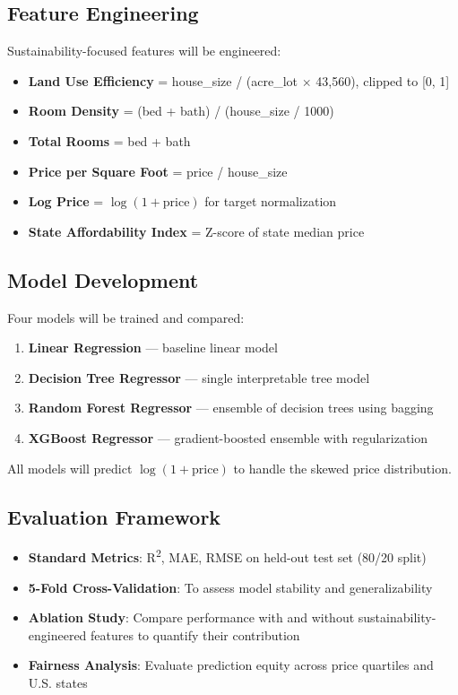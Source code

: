 \documentclass[12pt, a4paper]{article}
\begin{document}
\subsection{Feature Engineering}

Sustainability-focused features will be engineered:
\begin{itemize}
    \item \textbf{Land Use Efficiency} = house\_size / (acre\_lot $\times$ 43,560), clipped to [0, 1]
    \item \textbf{Room Density} = (bed + bath) / (house\_size / 1000)
    \item \textbf{Total Rooms} = bed + bath
    \item \textbf{Price per Square Foot} = price / house\_size
    \item \textbf{Log Price} = $\log(1 + \text{price})$ for target normalization
    \item \textbf{State Affordability Index} = Z-score of state median price
\end{itemize}

\subsection{Model Development}

Four models will be trained and compared:

\begin{enumerate}[label=\arabic*.]
    \item \textbf{Linear Regression} --- baseline linear model
    \item \textbf{Decision Tree Regressor} --- single interpretable tree model
    \item \textbf{Random Forest Regressor} --- ensemble of decision trees using bagging
    \item \textbf{XGBoost Regressor} --- gradient-boosted ensemble with regularization
\end{enumerate}

All models will predict $\log(1 + \text{price})$ to handle the skewed price distribution.

\subsection{Evaluation Framework}

\begin{itemize}
    \item \textbf{Standard Metrics}: R\textsuperscript{2}, MAE, RMSE on held-out test set (80/20 split)
    \item \textbf{5-Fold Cross-Validation}: To assess model stability and generalizability
    \item \textbf{Ablation Study}: Compare performance with and without sustainability-engineered features to quantify their contribution
    \item \textbf{Fairness Analysis}: Evaluate prediction equity across price quartiles and U.S. states
\end{itemize}
\end{document}
